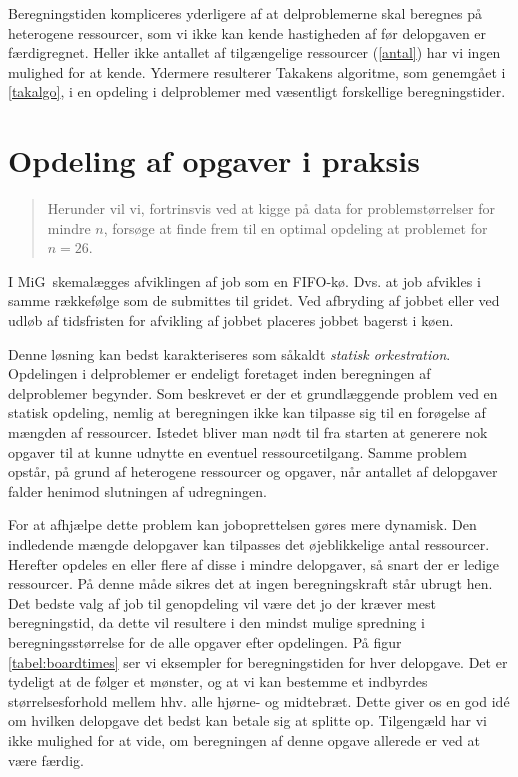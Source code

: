 \documentclass[pdf,draft,a4paper,11pt]{article}
\newcommand{\mig}{MiG}
\begin{document}
  

Beregningstiden kompliceres yderligere af at delproblemerne skal beregnes på heterogene ressourcer, som vi ikke kan kende hastigheden af før delopgaven er færdigregnet. Heller ikke antallet af tilgængelige ressourcer (\ref{antal}) har vi ingen mulighed for at kende. Ydermere resulterer Takakens algoritme, som genemgået i \ref{takalgo}, i en opdeling i delproblemer med væsentligt forskellige beregningstider.


\section{Opdeling af opgaver i praksis}
\begin{verse}
	Herunder vil vi, fortrinsvis ved at kigge på data for problemstørrelser for mindre $n$, forsøge at finde frem til en optimal opdeling at problemet for $n=26$.
\end{verse}

I \mig\ skemalægges afviklingen af job som en FIFO-kø. Dvs. at job afvikles i samme rækkefølge som de submittes til gridet. Ved afbryding af jobbet eller ved udløb af tidsfristen for afvikling af jobbet placeres jobbet bagerst i køen. 


Denne løsning kan bedst karakteriseres som såkaldt \emph{statisk orkestration}. Opdelingen i delproblemer er endeligt foretaget inden beregningen af delproblemer begynder. Som beskrevet er der et grundlæggende problem ved en statisk opdeling, nemlig at beregningen ikke kan tilpasse sig til en forøgelse af mængden af ressourcer. Istedet bliver man nødt til fra starten at generere nok opgaver til at kunne udnytte en eventuel ressourcetilgang. Samme problem opstår, på grund af heterogene ressourcer og opgaver, når antallet af delopgaver falder henimod slutningen af udregningen. 

For at afhjælpe dette problem kan joboprettelsen gøres mere dynamisk. Den indledende mængde delopgaver kan tilpasses det øjeblikkelige antal ressourcer. Herefter opdeles en eller flere af disse i mindre delopgaver, så snart der er ledige ressourcer. På denne måde sikres det at ingen beregningskraft står ubrugt hen. 
Det bedste valg af job til genopdeling vil være det jo der kræver mest beregningstid, da dette vil resultere i den mindst mulige spredning i beregningsstørrelse for de alle opgaver efter opdelingen. På figur \ref{tabel:boardtimes} ser vi eksempler for beregningstiden for hver delopgave. Det er tydeligt at de følger et mønster, og at vi kan bestemme et indbyrdes størrelsesforhold mellem hhv. alle hjørne- og midtebræt. Dette giver os en god idé om hvilken delopgave det bedst kan betale sig at splitte op. Tilgengæld har vi ikke mulighed for at vide, om beregningen af denne opgave allerede er ved at være færdig. 
\end{document}

